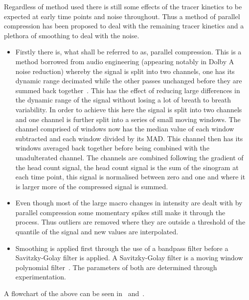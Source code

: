                     Regardless of method used there is still some effects of the tracer kinetics to be expected at early time points and noise throughout. Thus a method of parallel compression has been proposed to deal with the remaining tracer kinetics and a plethora of smoothing to deal with the noise.
                    
                    \begin{itemize}
                        \item Firstly there is, what shall be referred to as, parallel compression. This is a method borrowed from audio engineering (appearing notably in Dolby A noise reduction) whereby the signal is split into two channels, one has its dynamic range decimated while the other passes unchanged before they are summed back together~. This has the effect of reducing large differences in the dynamic range of the signal without losing a lot of breath to breath variability. In order to achieve this here the signal is split into two channels and one channel is further split into a series of small moving windows. The channel comprised of windows now has the median value of each window subtracted and each window divided by its \gls{MAD}. This channel then has its windows averaged back together before being combined with the unadulterated channel. The channels are combined following the gradient of the head count signal, the head count signal is the sum of the sinogram at each time point, this signal is normalised between zero and one and where it is larger more of the compressed signal is summed.
                        
                        \item Even though most of the large macro changes in intensity are dealt with by parallel compression some momentary spikes still make it through the process. Thus outliers are removed where they are outside a threshold of the quantile of the signal and new values are interpolated.
                        
                        \item Smoothing is applied first through the use of a bandpass filter before a Savitzky-Golay filter is applied. A Savitzky-Golay filter is a moving window polynomial filter~. The parameters of both are determined through experimentation.
                    \end{itemize}
                    
                    A flowchart of the above can be seen in~ and~.
            
